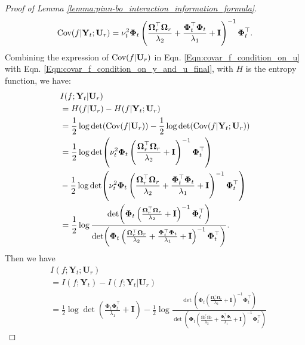 \begin{proof}[Proof of Lemma \ref{lemma:pinn-bo_interaction_information_formula}]
\begin{equation}
\label{Eqn:covar_f_condition_on_y_and_u_final}
    \textup{Cov}(f \rvert \mathbf{Y}_t; \mathbf{U}_r) = \nu_t^2\boldsymbol{\Phi}_t \left(\frac{\boldsymbol{\Omega}_r^\top\boldsymbol{\Omega}_r}{\lambda_2}+\frac{\boldsymbol{\Phi}_t^\top \boldsymbol{\Phi}_t} {\lambda_1} + \mathbf{I}\right)^{-1} \boldsymbol{\Phi}_t^\top.
\end{equation}
Combining the expression of $\textup{Cov}(f\rvert \mathbf{U}_r)$ in Eqn. \eqref{Eqn:covar_f_condition_on_u} with Eqn. \eqref{Eqn:covar_f_condition_on_y_and_u_final}, with $H$ is the entropy function, we have:
\begin{align}
     & I(f;\mathbf{Y}_t \rvert \mathbf{U}_r)  \nonumber
\\
     &= H(f \rvert \mathbf{U}_r) - H(f \rvert \mathbf{Y}_t; \mathbf{U}_r)  \nonumber
\\
     & = \frac{1}{2}\log\det (\textup{Cov}(f \rvert \mathbf{U}_r)) - \frac{1}{2}\log\det (\textup{Cov}(f \rvert \mathbf{Y}_t;  \mathbf{U}_r)) \nonumber
\\
     & = \frac{1}{2}\log \det (\nu_t^2\boldsymbol{\Phi}_t \left(\frac{\boldsymbol{\Omega}_r^\top \boldsymbol{\Omega}_r}{\lambda_2} + \mathbf{I}\right)^{-1} \boldsymbol{\Phi}_t^\top) \nonumber 
\\
     & - \frac{1}{2}\log\det (\nu_t^2\boldsymbol{\Phi}_t \left(\frac{\boldsymbol{\Omega}_r^\top\boldsymbol{\Omega}_r}{\lambda_2}+\frac{\boldsymbol{\Phi}_t^\top \boldsymbol{\Phi}_t} {\lambda_1} + \mathbf{I}\right)^{-1} \boldsymbol{\Phi}_t^\top) \nonumber
\\
     &= \frac{1}{2} \log \frac{\det(\boldsymbol{\Phi}_t \left(\frac{\boldsymbol{\Omega}_r^\top \boldsymbol{\Omega}_r}{\lambda_2} + \mathbf{I}\right)^{-1} \boldsymbol{\Phi}_t^\top)}{\det(\boldsymbol{\Phi}_t \left(\frac{\boldsymbol{\Omega}_r^\top\boldsymbol{\Omega}_r}{\lambda_2}+\frac{\boldsymbol{\Phi}_t^\top \boldsymbol{\Phi}_t} {\lambda_1} + \mathbf{I}\right)^{-1} \boldsymbol{\Phi}_t^\top)}. \label{Eqn:conditional_information_f_and_Yt_give_Ur}
\end{align}
Then we have 
\begin{align}
    & I (f; \mathbf{Y}_t; \mathbf{U}_r) \nonumber 
\\
    & =  I(f; \mathbf{Y}_t) - I (f; \mathbf{Y}_t \rvert \mathbf{U}_r) \nonumber
\\
        &= \frac{1}{2} \log \det (\frac{\boldsymbol{\Phi}_t\boldsymbol{\Phi}_t^\top}{\lambda_1} +\mathbf{I}) - \frac{1}{2} \log \frac{\det(\boldsymbol{\Phi}_t \left(\frac{\boldsymbol{\Omega}_r^\top \boldsymbol{\Omega}_r}{\lambda_2} + \mathbf{I}\right)^{-1} \boldsymbol{\Phi}_t^\top)}{\det(\boldsymbol{\Phi}_t \left(\frac{\boldsymbol{\Omega}_r^\top\boldsymbol{\Omega}_r}{\lambda_2}+\frac{\boldsymbol{\Phi}_t^\top \boldsymbol{\Phi}_t} {\lambda_1} + \mathbf{I}\right)^{-1} \boldsymbol{\Phi}_t^\top)} \nonumber

\end{align}
\end{proof}
